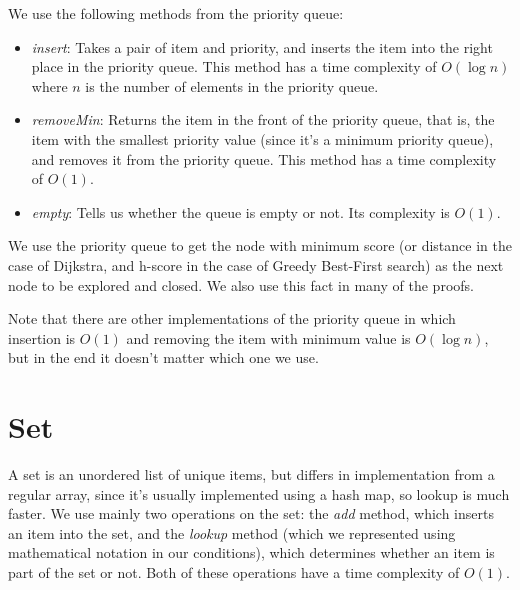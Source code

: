 \documentclass[12pt]{report}
\begin{document}
\begin{appendices}
We use the following methods from the priority queue:
\begin{itemize}
\item \emph{insert}: Takes a pair of item and priority, and inserts the item into the right place in the priority queue. This method has a time complexity of $O(\log n)$ where $n$ is the number of elements in the priority queue.
\item \emph{removeMin}: Returns the item in the front of the priority queue, that is, the item with the smallest priority value (since it's a minimum priority queue), and removes it from the priority queue. This method has a time complexity of $O(1)$.
\item \emph{empty}: Tells us whether the queue is empty or not. Its complexity is $O(1)$.
\end{itemize}

We use the priority queue to get the node with minimum score (or distance in the case of Dijkstra, and h-score in the case of Greedy Best-First search) as the next node to be explored and closed. We also use this fact in many of the proofs.

Note that there are other implementations of the priority queue in which insertion is $O(1)$ and removing the item with minimum value is $O(\log n)$, but in the end it doesn't matter which one we use.

\section{Set}
A set is an unordered list of unique items, but differs in implementation from a regular array, since it's usually implemented using a hash map, so lookup is much faster. We use mainly two operations on the set: the \emph{add} method, which inserts an item into the set, and the \emph{lookup} method (which we represented using mathematical notation in our conditions), which determines whether an item is part of the set or not. Both of these operations have a time complexity of $O(1)$.


\end{appendices}
\end{document}
